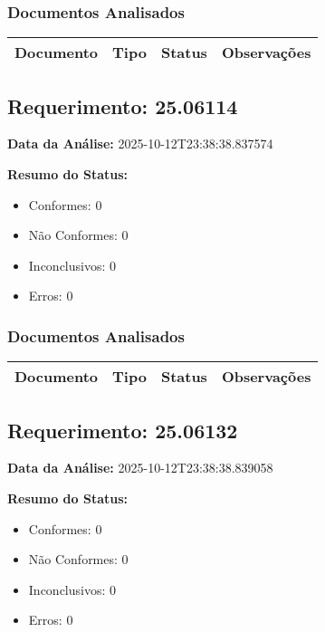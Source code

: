 \documentclass[12pt,a4paper]{article}
\begin{document}
\subsubsection{Documentos Analisados}

\begin{longtable}{|p{4cm}|p{2cm}|p{2cm}|p{6cm}|}
\hline
\textbf{Documento} & \textbf{Tipo} & \textbf{Status} & \textbf{Observações} \\
\hline
\endhead
\end{longtable}


\subsection{Requerimento: 25.06114}

\textbf{Data da Análise:} 2025-10-12T23:38:38.837574

\textbf{Resumo do Status:}
\begin{itemize}
    \item Conformes: 0
    \item Não Conformes: 0
    \item Inconclusivos: 0
    \item Erros: 0
\end{itemize}

\subsubsection{Documentos Analisados}

\begin{longtable}{|p{4cm}|p{2cm}|p{2cm}|p{6cm}|}
\hline
\textbf{Documento} & \textbf{Tipo} & \textbf{Status} & \textbf{Observações} \\
\hline
\endhead
\end{longtable}


\subsection{Requerimento: 25.06132}

\textbf{Data da Análise:} 2025-10-12T23:38:38.839058

\textbf{Resumo do Status:}
\begin{itemize}
    \item Conformes: 0
    \item Não Conformes: 0
    \item Inconclusivos: 0
    \item Erros: 0
\end{itemize}
\end{document}
